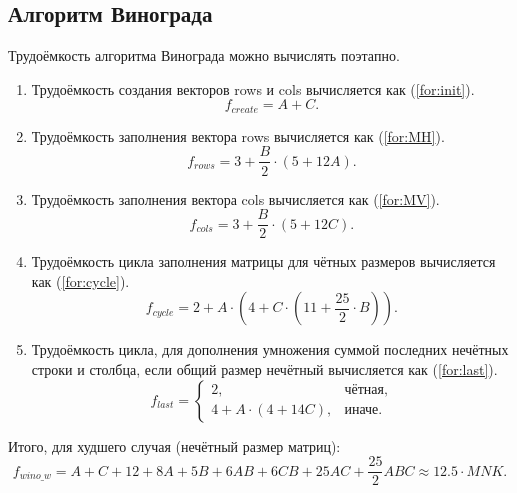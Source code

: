 \subsection{Алгоритм Винограда}

Трудоёмкость алгоритма Винограда можно вычислять поэтапно.

\begin{enumerate}
	\item Трудоёмкость создания векторов rows и cols вычисляется как (\ref{for:init}).
	\begin{equation}
	\label{for:init}
	f_{create} = A + C.
	\end{equation}
	
	\item Трудоёмкость заполнения вектора rows вычисляется как (\ref{for:MH}).
	\begin{equation}
	\label{for:MH}
	f_{rows} = 3 + \frac{B}{2} \cdot (5 + 12A).
	\end{equation}
	
	\item Трудоёмкость заполнения вектора cols вычисляется как (\ref{for:MV}).
	\begin{equation}
	\label{for:MV}
	f_{cols} = 3 + \frac{B}{2} \cdot (5 + 12C).
	\end{equation}
	
	\item Трудоёмкость цикла заполнения матрицы для чётных размеров вычисляется как (\ref{for:cycle}).
	\begin{equation}
	\label{for:cycle}
	f_{cycle} = 2 + A \cdot (4 + C \cdot (11 + \frac{25}{2} \cdot B)).
	\end{equation}
	
	\item Трудоёмкость цикла, для дополнения умножения суммой последних нечётных строки и столбца, если общий размер нечётный вычисляется как (\ref{for:last}).
	\begin{equation}
	\label{for:last}
	f_{last} = \begin{cases}
	2, & \text{чётная,}\\
	4 + A \cdot (4 + 14C), & \text{иначе.}
	\end{cases}
	\end{equation}
\end{enumerate}

Итого, для худшего случая (нечётный размер матриц): 
\begin{equation}
\label{for:bad}
f_{wino\_w} = A + C + 12 + 8A + 5B + 6AB + 6CB + 25AC + \frac{25}{2}ABC \approx 12.5 \cdot MNK.
\end{equation}

